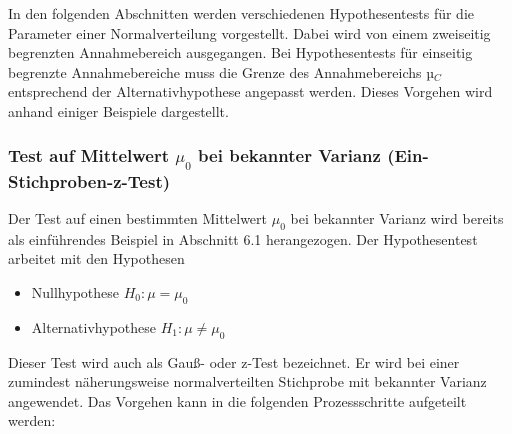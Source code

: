 \noindent In den folgenden Abschnitten werden verschiedenen Hypothesentests f\"{u}r die Parameter einer Normalverteilung vorgestellt. Dabei wird von einem zweiseitig begrenzten Annahmebereich ausgegangen. Bei Hypothesentests f\"{u}r einseitig begrenzte Annahmebereiche muss die Grenze des Annahmebereichs µ$_{C}$ entsprechend der Alternativhypothese angepasst werden. Dieses Vorgehen wird anhand einiger Beispiele dargestellt.

\subsubsection{Test auf Mittelwert \texorpdfstring{$\mu_{0}$}{Lg} bei bekannter Varianz (Ein-Stichproben-z-Test)}

\noindent Der Test auf einen bestimmten Mittelwert $\mu_{0}$ bei bekannter Varianz wird bereits als einf\"{u}hrendes Beispiel in Abschnitt 6.1 herangezogen. Der Hypothesentest arbeitet mit den Hypothesen
\begin{itemize}
    \item Nullhypothese $H_{0} : \mu = \mu_{0}$
    \item Alternativhypothese $H_{1} : \mu \neq \mu_{0}$
\end{itemize}

\noindent Dieser Test wird auch als Gau{\ss}- oder z-Test bezeichnet. Er wird bei einer zumindest n\"{a}herungsweise normalverteilten Stichprobe mit bekannter Varianz angewendet. Das Vorgehen kann in die folgenden Prozessschritte aufgeteilt werden:

